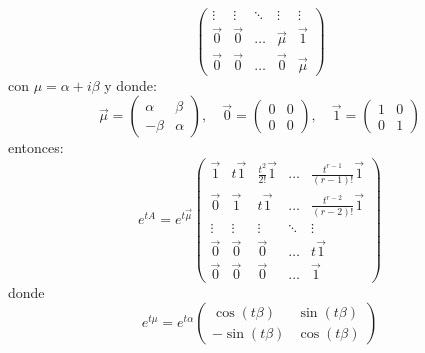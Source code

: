 \begin{enumerate}
$$\begin{pmatrix}
                  \vdots    & \vdots    & \ddots & \vdots    & \vdots    \\
                  \vec{0}   & \vec{0}   & \dots  & \vec{\mu} & \vec{1}   \\
                  \vec{0}   & \vec{0}   & \dots  & \vec{0}   & \vec{\mu}
              \end{pmatrix}$$
          con $\mu = \alpha + i\beta$ y donde:
          $$\vec{\mu} = \begin{pmatrix}
                  \alpha & \beta  \\
                  -\beta & \alpha
              \end{pmatrix}, \quad
              \vec{0} = \begin{pmatrix}
                  0 & 0 \\
                  0 & 0
              \end{pmatrix}, \quad
              \vec{1} = \begin{pmatrix}
                  1 & 0 \\
                  0 & 1
              \end{pmatrix}$$
          entonces:
          $$e^{tA} = e^{t\vec{\mu}} \begin{pmatrix}
                  \vec{1} & t\vec{1} & \frac{t^2}{2!}\vec{1} & \dots  & \frac{t^{r-1}}{(r-1)!}\vec{1} \\
                  \vec{0} & \vec{1}  & t\vec{1}              & \dots  & \frac{t^{r-2}}{(r-2)!}\vec{1} \\
                  \vdots  & \vdots   & \vdots                & \ddots & \vdots                        \\
                  \vec{0} & \vec{0}  & \vec{0}               & \dots  & t\vec{1}                      \\
                  \vec{0} & \vec{0}  & \vec{0}               & \dots  & \vec{1}
              \end{pmatrix}$$
          donde
          $$e^{t\mu} = e^{t\alpha}\begin{pmatrix}
                  \cos(t\beta)  & \sin(t\beta) \\
                  -\sin(t\beta) & \cos(t\beta)
              \end{pmatrix}$$
\end{enumerate}

